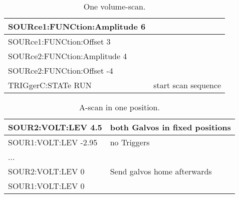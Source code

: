 	{	\begin{table}[h!]
		\scriptsize
			 \begin{tabular}{|p{5.5cm}|p{6cm}|} \hline
			SOURce1:FUNCtion:Amplitude 6	&	\\ \hline
			SOURce1:FUNCtion:Offset 3		&	\\ \hline
			SOURce2:FUNCtion:Amplitude 4	&	\\ \hline
			SOURce2:FUNCtion:Offset -4		&	\\ \hline
			TRIGgerC:STATe RUN				&	start scan sequence\\ \hline
			 \end{tabular}
			 \caption{One volume-scan.}
		\end{table}
	}
		\begin{table}[h!]
		\scriptsize
			 \begin{tabular}{|p{5.5cm}|p{6cm}|} \hline
			SOUR2:VOLT:LEV 4.5		& both Galvos in fixed positions	\\ \hline
			SOUR1:VOLT:LEV -2.95	& no Triggers	\\ \hline
			...	& 	\\ \hline
			SOUR2:VOLT:LEV 0	& Send galvos home afterwards	\\ \hline
			SOUR1:VOLT:LEV 0	& 	\\ \hline
			 \end{tabular}
			 \caption{A-scan in one position.}
		\end{table}

